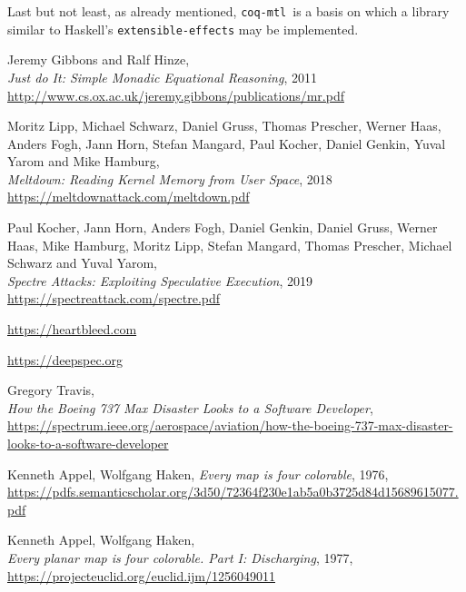 \documentclass[declaration,inz,english,shortabstract]{iithesis}
\newcommand{\libname}{\m{coq-mtl}}
\newcommand{\m}[1]{\texttt{#1}}
\begin{document}
Last but not least, as already mentioned, \libname\ is a basis on which a library similar to Haskell's \m{extensible-effects} may be implemented.


\begin{thebibliography}{1}

        Jeremy Gibbons and Ralf Hinze, \\
        \textit{Just do It: Simple Monadic Equational Reasoning}, 2011 \\
        \url{http://www.cs.ox.ac.uk/jeremy.gibbons/publications/mr.pdf}

        Moritz Lipp, Michael Schwarz, Daniel Gruss, Thomas Prescher, Werner Haas, Anders Fogh, Jann Horn, Stefan Mangard, Paul Kocher, Daniel Genkin, Yuval Yarom and Mike Hamburg, \\
        \textit{Meltdown: Reading Kernel Memory from User Space}, 2018 \\
        \url{https://meltdownattack.com/meltdown.pdf}

        Paul Kocher, Jann Horn, Anders Fogh, Daniel Genkin, Daniel Gruss, Werner Haas, Mike Hamburg, Moritz Lipp, Stefan Mangard, Thomas Prescher, Michael Schwarz and Yuval Yarom, \\
        \textit{Spectre Attacks: Exploiting Speculative Execution}, 2019 \\
        \url{https://spectreattack.com/spectre.pdf}
    
        \url{https://heartbleed.com}

        \url{https://deepspec.org}

        Gregory Travis, \\
        \textit{How the Boeing 737 Max Disaster Looks to a Software Developer}, \\
        \url{https://spectrum.ieee.org/aerospace/aviation/how-the-boeing-737-max-disaster-looks-to-a-software-developer}
    
        Kenneth Appel, Wolfgang Haken,
        \textit{Every map is four colorable}, 1976, \\
        \url{https://pdfs.semanticscholar.org/3d50/72364f230e1ab5a0b3725d84d15689615077.pdf}
    
        Kenneth Appel, Wolfgang Haken, \\
        \textit{Every planar map is four colorable. Part I: Discharging}, 1977, \\
        \url{https://projecteuclid.org/euclid.ijm/1256049011}


\end{thebibliography}
\end{document}
